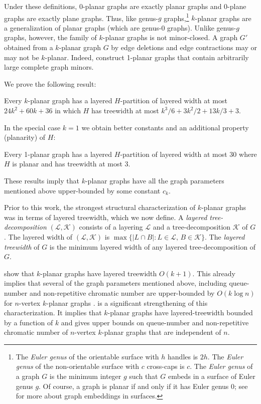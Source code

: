 \documentclass{patmorin}
\newcommand{\treewidth}{\ensuremath{k^3/6 + 3k^2/2 + 13k/3 + 3}}
\begin{document}
Under these definitions, $0$-planar graphs are exactly planar graphs and $0$-plane graphs are exactly plane graphs. Thus, like genus-$g$ graphs,\footnote{The \textit{Euler genus} of the orientable surface with $h$ handles is $2h$. The \textit{Euler genus} of the non-orientable surface with $c$ cross-caps is $c$. The \textit{Euler genus} of a graph $G$ is the minimum integer $g$ such that $G$ embeds in a surface of Euler genus $g$. Of course, a graph is planar if and only if it has Euler genus 0; see \citep{mohar.thomassen:graphs} for more about graph embeddings in surfaces.} $k$-planar graphs are a generalization of planar graphs (which are genus-$0$ graphs).  Unlike genus-$g$ graphs, however, the family of $k$-planar graphs is not minor-closed.  A graph $G'$ obtained from a $k$-planar graph $G$ by edge deletions and edge contractions may or may not be $k$-planar. Indeed, \citet{dujmovic.eppstein.ea:structure} construct 1-planar graphs that contain arbitrarily large complete graph minors.

We prove the following result:
\begin{thm}
  Every $k$-planar graph has a layered $H$-partition of layered width at most $24k^2 + 60k + 36$ in which $H$ has treewidth at most $\treewidth$.
\end{thm}

In the special case $k=1$ we obtain better constants and an additional property (planarity) of $H$:

\begin{thm}
  Every 1-planar graph has a layered $H$-partition of layered width at most 30 where $H$ is planar and has treewidth at most 3.
\end{thm}

These results imply that $k$-planar graphs have all the graph parameters mentioned above upper-bounded by some constant $c_k$.

Prior to this work, the strongest structural characterization of $k$-planar graphs was in terms of layered treewidth, which we now define.  A \emph{layered tree-decomposition} $(\mathcal{L},\mathcal{K})$ consists of a layering $\mathcal{L}$ and a tree-decomposition $\mathcal{K}$ of $G$. The layered width of $(\mathcal{L},\mathcal{K})$ is $\max\{|L\cap B|: L\in \mathcal{L},\, B\in \mathcal{K}\}$.  The \emph{layered treewidth} of $G$ is the minimum layered width of any layered tree-decomposition of $G$.

\citet{dujmovic.eppstein.ea:structure} show that $k$-planar graphs have layered treewidth $O(k+1)$.  This already implies that several of the graph parameters mentioned above, including queue-number and non-repetitive chromatic number are upper-bounded by $O(k\log n)$ for $n$-vertex $k$-planar graphs \cite{dujmovic.morin.ea:layered}.  is a significant strengthening of this characterization. It implies that $k$-planar graphs have layered-treewidth bounded by a function of $k$ and gives upper bounds on queue-number and non-repetitive chromatic number of $n$-vertex $k$-planar graphs that are independent of $n$.
\end{document}
